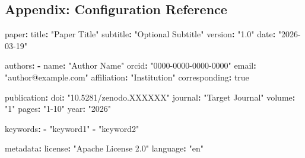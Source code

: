 \documentclass[
]{article}
\newenvironment{Shaded}{}{}
\newcommand{\AttributeTok}[1]{\textcolor[rgb]{0.49,0.56,0.16}{#1}}
\newcommand{\CharTok}[1]{\textcolor[rgb]{0.25,0.44,0.63}{#1}}
\newcommand{\FunctionTok}[1]{\textcolor[rgb]{0.02,0.16,0.49}{#1}}
\newcommand{\KeywordTok}[1]{\textcolor[rgb]{0.00,0.44,0.13}{\textbf{#1}}}
\newcommand{\StringTok}[1]{\textcolor[rgb]{0.25,0.44,0.63}{#1}}
\begin{document}
\newpage

\newpage

\subsection{Appendix: Configuration Reference}\label{appendix-config}

\begin{table}[h]
\caption{Configuration schema for \texttt{config.yaml}, showing all supported fields and their structure.}
\label{tab:config-reference}
\end{table}

\begin{Shaded}
\begin{Highlighting}[]
\FunctionTok{paper}\KeywordTok{:}
\AttributeTok{  }\FunctionTok{title}\KeywordTok{:}\AttributeTok{ }\StringTok{"Paper Title"}
\AttributeTok{  }\FunctionTok{subtitle}\KeywordTok{:}\AttributeTok{ }\StringTok{"Optional Subtitle"}
\AttributeTok{  }\FunctionTok{version}\KeywordTok{:}\AttributeTok{ }\StringTok{"1.0"}
\AttributeTok{  }\FunctionTok{date}\KeywordTok{:}\AttributeTok{ }\StringTok{"2026{-}03{-}19"}

\FunctionTok{authors}\KeywordTok{:}
\AttributeTok{  }\KeywordTok{{-}}\AttributeTok{ }\FunctionTok{name}\KeywordTok{:}\AttributeTok{ }\StringTok{"Author Name"}
\AttributeTok{    }\FunctionTok{orcid}\KeywordTok{:}\AttributeTok{ }\StringTok{"0000{-}0000{-}0000{-}0000"}
\AttributeTok{    }\FunctionTok{email}\KeywordTok{:}\AttributeTok{ }\StringTok{"author@example.com"}
\AttributeTok{    }\FunctionTok{affiliation}\KeywordTok{:}\AttributeTok{ }\StringTok{"Institution"}
\AttributeTok{    }\FunctionTok{corresponding}\KeywordTok{:}\AttributeTok{ }\CharTok{true}

\FunctionTok{publication}\KeywordTok{:}
\AttributeTok{  }\FunctionTok{doi}\KeywordTok{:}\AttributeTok{ }\StringTok{"10.5281/zenodo.XXXXXX"}
\AttributeTok{  }\FunctionTok{journal}\KeywordTok{:}\AttributeTok{ }\StringTok{"Target Journal"}
\AttributeTok{  }\FunctionTok{volume}\KeywordTok{:}\AttributeTok{ }\StringTok{"1"}
\AttributeTok{  }\FunctionTok{pages}\KeywordTok{:}\AttributeTok{ }\StringTok{"1{-}10"}
\AttributeTok{  }\FunctionTok{year}\KeywordTok{:}\AttributeTok{ }\StringTok{"2026"}

\FunctionTok{keywords}\KeywordTok{:}
\AttributeTok{  }\KeywordTok{{-}}\AttributeTok{ }\StringTok{"keyword1"}
\AttributeTok{  }\KeywordTok{{-}}\AttributeTok{ }\StringTok{"keyword2"}

\FunctionTok{metadata}\KeywordTok{:}
\AttributeTok{  }\FunctionTok{license}\KeywordTok{:}\AttributeTok{ }\StringTok{"Apache License 2.0"}
\AttributeTok{  }\FunctionTok{language}\KeywordTok{:}\AttributeTok{ }\StringTok{"en"}


\end{Highlighting}
\end{Shaded}
\end{document}
